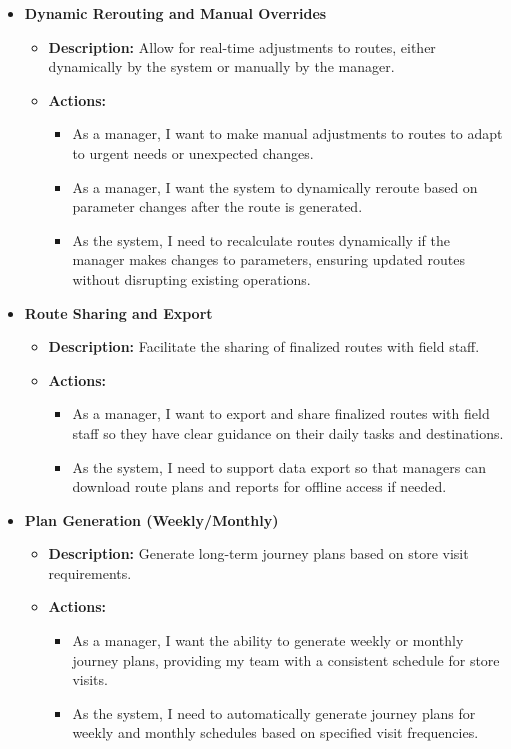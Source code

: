 \begin{itemize}
    \item \textbf{Dynamic Rerouting and Manual Overrides}
    \begin{itemize}
        \item \textbf{Description:} Allow for real-time adjustments to routes, either dynamically by the system or manually by the manager.
        \item \textbf{Actions:}
        \begin{itemize}
            \item As a manager, I want to make manual adjustments to routes to adapt to urgent needs or unexpected changes.
            \item As a manager, I want the system to dynamically reroute based on parameter changes after the route is generated.
            \item As the system, I need to recalculate routes dynamically if the manager makes changes to parameters, ensuring updated routes without disrupting existing operations.
        \end{itemize}
    \end{itemize}
    
    \item \textbf{Route Sharing and Export}
    \begin{itemize}
        \item \textbf{Description:} Facilitate the sharing of finalized routes with field staff.
        \item \textbf{Actions:}
        \begin{itemize}
            \item As a manager, I want to export and share finalized routes with field staff so they have clear guidance on their daily tasks and destinations.
            \item As the system, I need to support data export so that managers can download route plans and reports for offline access if needed.
        \end{itemize}
    \end{itemize}
    
    \item \textbf{Plan Generation (Weekly/Monthly)}
    \begin{itemize}
        \item \textbf{Description:} Generate long-term journey plans based on store visit requirements.
        \item \textbf{Actions:}
        \begin{itemize}
            \item As a manager, I want the ability to generate weekly or monthly journey plans, providing my team with a consistent schedule for store visits.
            \item As the system, I need to automatically generate journey plans for weekly and monthly schedules based on specified visit frequencies.
        \end{itemize}
    \end{itemize}
    

\end{itemize}

